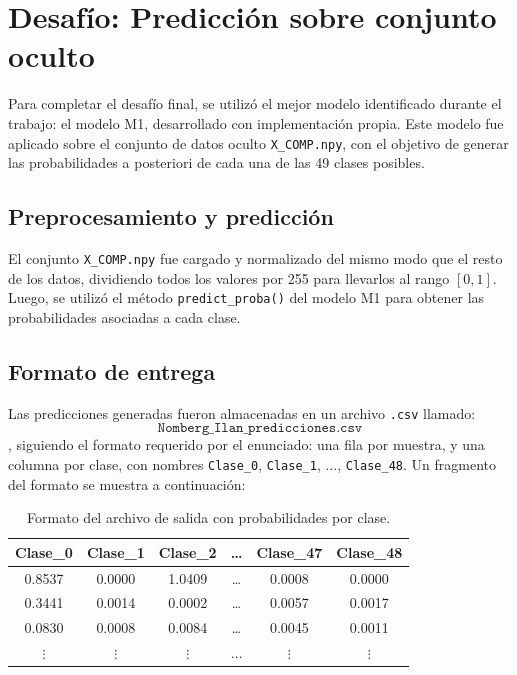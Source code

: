 \documentclass[11pt]{article}
\begin{document}
\section{Desafío: Predicción sobre conjunto oculto}

Para completar el desafío final, se utilizó el mejor modelo identificado durante el trabajo: el modelo M1, desarrollado con implementación propia. Este modelo fue aplicado sobre el conjunto de datos oculto \texttt{X\_COMP.npy}, con el objetivo de generar las probabilidades a posteriori de cada una de las 49 clases posibles.

\subsection*{Preprocesamiento y predicción}

El conjunto \texttt{X\_COMP.npy} fue cargado y normalizado del mismo modo que el resto de los datos, dividiendo todos los valores por 255 para llevarlos al rango \([0, 1]\). Luego, se utilizó el método \texttt{predict\_proba()} del modelo M1 para obtener las probabilidades asociadas a cada clase.

\subsection*{Formato de entrega}

Las predicciones generadas fueron almacenadas en un archivo \texttt{.csv} llamado:
\[\texttt{Nomberg\_Ilan\_predicciones.csv}\], siguiendo el formato requerido por el enunciado: una fila por muestra, y una columna por clase, con nombres \texttt{Clase\_0}, \texttt{Clase\_1}, ..., \texttt{Clase\_48}. Un fragmento del formato se muestra a continuación:

\begin{table}[H]
    \centering
    \begin{tabular}{cccccc}
    \toprule
    Clase\_0 & Clase\_1 & Clase\_2 & \dots & Clase\_47 & Clase\_48 \\
    \midrule
    0.8537 & 0.0000 & 1.0409 & \dots & 0.0008 & 0.0000 \\
    0.3441 & 0.0014 & 0.0002 & \dots & 0.0057 & 0.0017 \\
    0.0830 & 0.0008 & 0.0084 & \dots & 0.0045 & 0.0011 \\
    $\vdots$ & $\vdots$ & $\vdots$ & $\dots$ & $\vdots$ & $\vdots$ \\
    \bottomrule
    \end{tabular}
    \caption{Formato del archivo de salida con probabilidades por clase.}
    \label{tab:predicciones_csv}
\end{table}
\end{document}
